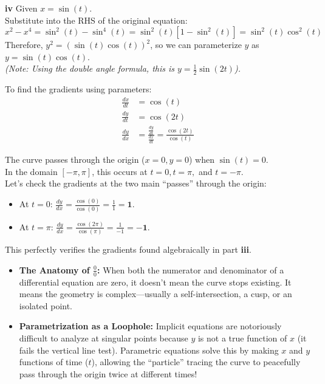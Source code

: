 \begin{solution}
\vspace{0.3cm}
\textbf{iv} Given $x = \sin(t)$. \\
Substitute into the RHS of the original equation:
\[ x^2 - x^4 = \sin^2(t) - \sin^4(t) = \sin^2(t)[1 - \sin^2(t)] = \sin^2(t)\cos^2(t) \]
Therefore, $y^2 = (\sin(t)\cos(t))^2$, so we can parameterize $y$ as \textbf{$y = \sin(t)\cos(t)$}. \\
\textit{(Note: Using the double angle formula, this is $y = \frac{1}{2}\sin(2t)$).}

To find the gradients using parameters:
\begin{align*}
    \frac{dx}{dt} &= \cos(t) \\
    \frac{dy}{dt} &= \cos(2t) \\
    \frac{dy}{dx} &= \frac{\frac{dy}{dt}}{\frac{dx}{dt}} = \frac{\cos(2t)}{\cos(t)}
\end{align*}

The curve passes through the origin ($x=0, y=0$) when $\sin(t) = 0$. \\
In the domain $[-\pi, \pi]$, this occurs at $t = 0, t = \pi,$ and $t = -\pi$. \\
Let's check the gradients at the two main ``passes'' through the origin:
\begin{itemize}
    \item At $t = 0$: $\frac{dy}{dx} = \frac{\cos(0)}{\cos(0)} = \frac{1}{1} = \mathbf{1}$.
    \item At $t = \pi$: $\frac{dy}{dx} = \frac{\cos(2\pi)}{\cos(\pi)} = \frac{1}{-1} = \mathbf{-1}$.
\end{itemize}
This perfectly verifies the gradients found algebraically in part \textbf{iii}.
\end{solution}

\begin{takeaways}
\begin{itemize}[leftmargin=*]
    \item \textbf{The Anatomy of $\frac{0}{0}$:} When both the numerator and denominator of a differential equation are zero, it doesn't mean the curve stops existing. It means the geometry is complex—usually a self-intersection, a cusp, or an isolated point.
    \item \textbf{Parametrization as a Loophole:} Implicit equations are notoriously difficult to analyze at singular points because $y$ is not a true function of $x$ (it fails the vertical line test). Parametric equations solve this by making $x$ and $y$ functions of time ($t$), allowing the ``particle'' tracing the curve to peacefully pass through the origin twice at different times!
\end{itemize}
\end{takeaways}

